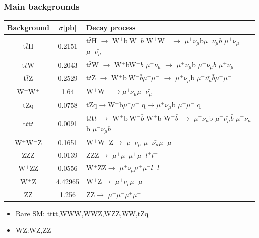 \documentclass[11pt]{beamer}
\begin{document}
\begin{frame}
\frametitle{Main backgrounds}
\begin{center}
\scriptsize{
\begin{tabular}{|c|c|p{7cm}|}
	\hline
	Background & $\sigma$[pb] & Decay process \\
	\hline
t$\bar{t}$H	& 0.2151 & t$\bar{t}$H $\rightarrow$ W$^+$b W$^- \bar{b}$ W$^+$W$^-$ $\rightarrow$ $\mu^+ \nu_\mu$b$\mu^- \bar{\nu_\mu}\bar{b}$ $\mu^+\nu_\mu$ $\mu^-\bar{\nu_\mu}$\\
\hline  
t$\bar{t}$W  &0.2043 &t$\bar{t}$W  $\rightarrow$  W$^+$bW$^- \bar{b}$ $\mu^+\nu_\mu$ $\rightarrow$ $\mu^+ \nu_\mu$b $\mu^- \bar{\nu_\mu} \bar{b}$ $\mu^+ \nu_\mu$\\
\hline
 t$\bar{t}$Z & 0.2529 & t$\bar{t}$Z  $\rightarrow$ W$^+$b  W$^-$$\bar{b} \mu^+ \mu^-$ $\rightarrow$ $\mu^+ \nu_\mu$b $\mu^- \bar{\nu_\mu} \bar{b}\mu^+ \mu^-$  \\
 \hline 
  W$^\pm$W$^\pm$  &1.64 & W$^+$W$^-$ $\rightarrow$$\mu^+\nu_\mu$$\mu^-\bar{\nu_\mu}$ \\
    \hline 
  tZq  &0.0758 & tZq$\rightarrow$W$^+$b$\mu^+ \mu^-$ q$\rightarrow$$\mu^+ \nu_\mu$b $\mu^+\mu^-$ q \\
    \hline 
  t$\bar{t}$t$\bar{t}$  & 0.0091&t$\bar{t}$t$\bar{t}$ $\rightarrow$ W$^+$b   W$^- \bar{b}$  W$^+$b  W$^- \bar{b}$   $\rightarrow$ $\mu^+ \nu_\mu$b $\mu^- \bar{\nu_\mu} \bar{b}$ $\mu^+ \nu_\mu$b   $\mu^- \bar{\nu_\mu} \bar{b}$ \\
    \hline 
  W$^+$W$^-$Z  & 0.1651& W$^+$W$^-$Z$\rightarrow$ $\mu^+ \nu_\mu$ $\mu^- \bar{\nu_\mu} \mu^+ \mu^-$\\
    \hline 
 ZZZ  &0.0139 & ZZZ$\rightarrow$ $\mu^+ \mu^-\mu^+ \mu^-l^+ l^-$  \\
    \hline 
  W$^+$ZZ  & 0.0556&W$^+$ZZ$\rightarrow$ $\mu^+ \nu_\mu \mu^+ \mu^- l^+l^-$ \\
  \hline 
 W$^+$Z &4.42965 &W$^+$Z$\rightarrow$ $\mu^+ \nu_\mu \mu^+ \mu^-$ \\
 \hline
ZZ &  1.256 &ZZ$\rightarrow$ $\mu^+ \mu^- \mu^+ \mu^-$ \\
 \hline
\end{tabular}
}
\end{center}
\tiny{
\begin{itemize}
	\item Rare SM: tttt,WWW,WWZ,WZZ,WW,tZq
	\item WZ:WZ,ZZ
\end{itemize}}
\end{frame}
\end{document}
